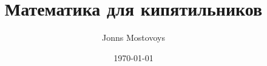 \documentclass{book}
\begin{document}
\title{Математика для кипятильников}
\date{\today}
\author{Jonns Mostovoys}
\maketitle

\tableofcontents
	\mainmatter
	
%	
\end{document}

